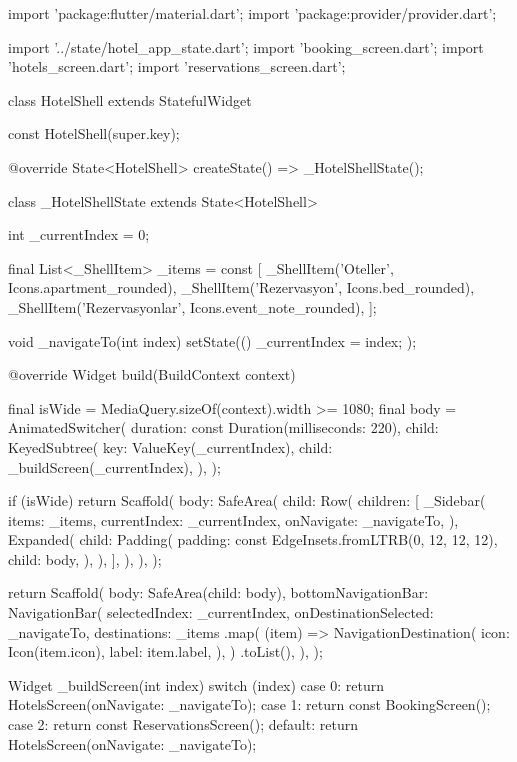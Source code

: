 \documentclass[11pt,a4paper]{article}
\begin{document}
\begin{codeblock}
import 'package:flutter/material.dart';
import 'package:provider/provider.dart';

import '../state/hotel_app_state.dart';
import 'booking_screen.dart';
import 'hotels_screen.dart';
import 'reservations_screen.dart';

class HotelShell extends StatefulWidget {
  const HotelShell({super.key});

  @override
  State<HotelShell> createState() => _HotelShellState();
}

class _HotelShellState extends State<HotelShell> {
  int _currentIndex = 0;

  final List<_ShellItem> _items = const [
    _ShellItem('Oteller', Icons.apartment_rounded),
    _ShellItem('Rezervasyon', Icons.bed_rounded),
    _ShellItem('Rezervasyonlar', Icons.event_note_rounded),
  ];

  void _navigateTo(int index) {
    setState(() {
      _currentIndex = index;
    });
  }

  @override
  Widget build(BuildContext context) {
    final isWide = MediaQuery.sizeOf(context).width >= 1080;
    final body = AnimatedSwitcher(
      duration: const Duration(milliseconds: 220),
      child: KeyedSubtree(
        key: ValueKey(_currentIndex),
        child: _buildScreen(_currentIndex),
      ),
    );

    if (isWide) {
      return Scaffold(
        body: SafeArea(
          child: Row(
            children: [
              _Sidebar(
                items: _items,
                currentIndex: _currentIndex,
                onNavigate: _navigateTo,
              ),
              Expanded(
                child: Padding(
                  padding: const EdgeInsets.fromLTRB(0, 12, 12, 12),
                  child: body,
                ),
              ),
            ],
          ),
        ),
      );
    }

    return Scaffold(
      body: SafeArea(child: body),
      bottomNavigationBar: NavigationBar(
        selectedIndex: _currentIndex,
        onDestinationSelected: _navigateTo,
        destinations: _items
            .map(
              (item) => NavigationDestination(
                icon: Icon(item.icon),
                label: item.label,
              ),
            )
            .toList(),
      ),
    );
  }

  Widget _buildScreen(int index) {
    switch (index) {
      case 0:
        return HotelsScreen(onNavigate: _navigateTo);
      case 1:
        return const BookingScreen();
      case 2:
        return const ReservationsScreen();
      default:
        return HotelsScreen(onNavigate: _navigateTo);
    }
  }
}


\end{codeblock}
\end{document}
